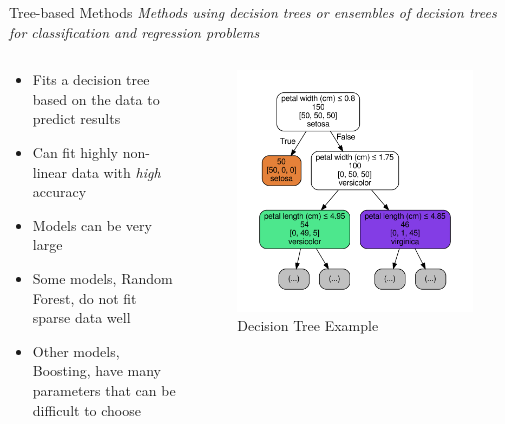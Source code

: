 \documentclass[10pt]{beamer}
\begin{document}
\begin{frame}{Tree-based Methods}
\emph{Methods using decision trees or ensembles of decision trees for classification and regression problems}
	\begin{columns}
	\begin{column}{0.5\textwidth}
	\begin{itemize}
		\item Fits a decision tree based on the data to predict results
		\item Can fit highly non-linear data with \emph{high} accuracy
		\item Models can be very large
		\item Some models, Random Forest, do not fit sparse data well
		\item Other models, Boosting, have many parameters that can be difficult to choose
	\end{itemize}
	\end{column}
	\begin{column}{0.5\textwidth}
		\begin{figure}
			\caption{Decision Tree Example}
			\includegraphics[width=1.0\textwidth, center, trim=1cm 0cm 0 0cm]{images/DT_3_simple.pdf}
	\end{figure}
	\end{column}
	\end{columns}
\end{frame}
\end{document}
